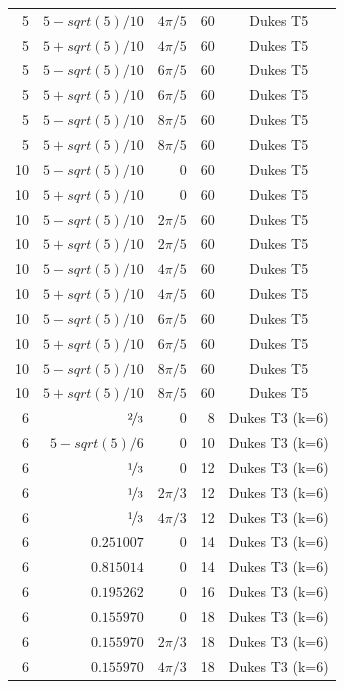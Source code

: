 \documentclass[aps,pra,reprint,amsmath,amssymb,superscriptaddress,floatfix]{revtex4-2}
\def\frac#1#2{#1/#2}%
\def\sqrt#1{sqrt(#1)}%
\begin{document}
\begin{longtable}{rrrrc}
5 & $\frac{5 - \sqrt{5}}{10}$ & $4\pi/5$ & 60 & Dukes T5 \\
5 & $\frac{5 + \sqrt{5}}{10}$ & $4\pi/5$ & 60 & Dukes T5 \\
5 & $\frac{5 - \sqrt{5}}{10}$ & $6\pi/5$ & 60 & Dukes T5 \\
5 & $\frac{5 + \sqrt{5}}{10}$ & $6\pi/5$ & 60 & Dukes T5 \\
5 & $\frac{5 - \sqrt{5}}{10}$ & $8\pi/5$ & 60 & Dukes T5 \\
5 & $\frac{5 + \sqrt{5}}{10}$ & $8\pi/5$ & 60 & Dukes T5 \\
10 & $\frac{5 - \sqrt{5}}{10}$ & $0$ & 60 & Dukes T5 \\
10 & $\frac{5 + \sqrt{5}}{10}$ & $0$ & 60 & Dukes T5 \\
10 & $\frac{5 - \sqrt{5}}{10}$ & $2\pi/5$ & 60 & Dukes T5 \\
10 & $\frac{5 + \sqrt{5}}{10}$ & $2\pi/5$ & 60 & Dukes T5 \\
10 & $\frac{5 - \sqrt{5}}{10}$ & $4\pi/5$ & 60 & Dukes T5 \\
10 & $\frac{5 + \sqrt{5}}{10}$ & $4\pi/5$ & 60 & Dukes T5 \\
10 & $\frac{5 - \sqrt{5}}{10}$ & $6\pi/5$ & 60 & Dukes T5 \\
10 & $\frac{5 + \sqrt{5}}{10}$ & $6\pi/5$ & 60 & Dukes T5 \\
10 & $\frac{5 - \sqrt{5}}{10}$ & $8\pi/5$ & 60 & Dukes T5 \\
10 & $\frac{5 + \sqrt{5}}{10}$ & $8\pi/5$ & 60 & Dukes T5 \\
6 & $\nicefrac{2}{3}$ & $0$ & 8 & Dukes T3 (k=6) \\
6 & $\frac{5 - \sqrt{5}}{6}$ & $0$ & 10 & Dukes T3 (k=6) \\
6 & $\nicefrac{1}{3}$ & $0$ & 12 & Dukes T3 (k=6) \\
6 & $\nicefrac{1}{3}$ & $2\pi/3$ & 12 & Dukes T3 (k=6) \\
6 & $\nicefrac{1}{3}$ & $4\pi/3$ & 12 & Dukes T3 (k=6) \\
6 & $0.251007$ & $0$ & 14 & Dukes T3 (k=6) \\
6 & $0.815014$ & $0$ & 14 & Dukes T3 (k=6) \\
6 & $0.195262$ & $0$ & 16 & Dukes T3 (k=6) \\
6 & $0.155970$ & $0$ & 18 & Dukes T3 (k=6) \\
6 & $0.155970$ & $2\pi/3$ & 18 & Dukes T3 (k=6) \\
6 & $0.155970$ & $4\pi/3$ & 18 & Dukes T3 (k=6) \\

\end{longtable}
\end{document}
